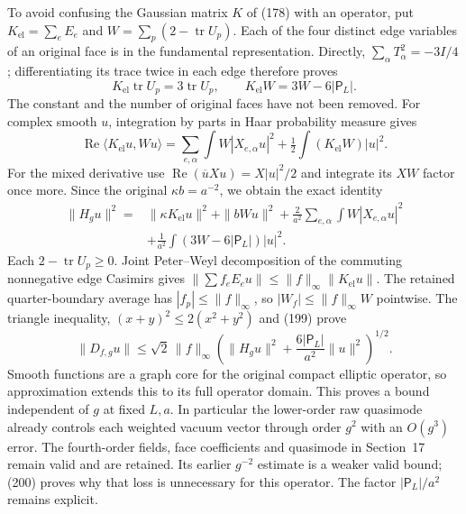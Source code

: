 \documentclass[11pt]{article}
\begin{document}
To avoid confusing the Gaussian matrix $K$ of (178)
with an operator, put $K_{\mathrm{el}}=\sum_eE_e$ and
$W=\sum_p(2-\operatorname{tr}U_p)$. Each of the four distinct edge
variables of an original face is in the fundamental representation.
Directly, $\sum_\alpha T_\alpha^2=-3I/4$; differentiating its
trace twice in each edge therefore proves
\[
 K_{\mathrm{el}}\operatorname{tr}U_p=3\operatorname{tr}U_p,
 \qquad K_{\mathrm{el}}W=3W-6|\mathsf P_L|.
\]
The constant and the number of original faces have not been removed.
For complex smooth $u$, integration by parts in Haar probability
measure gives
\[
 \operatorname{Re}\langle K_{\mathrm{el}}u,Wu\rangle
 =\sum_{e,\alpha}\int W|X_{e,\alpha}u|^2
       +\tfrac12\int(K_{\mathrm{el}}W)|u|^2.
\]
For the mixed derivative use
$\operatorname{Re}(\overline u Xu)=X|u|^2/2$ and integrate its
$XW$ factor once more. Since the original $\kappa b=a^{-2}$,
we obtain the exact identity
\begin{align}
 \|H_gu\|^2={}&\|\kappa K_{\mathrm{el}}u\|^2+\|bWu\|^2
   +\frac2{a^2}\sum_{e,\alpha}\int W|X_{e,\alpha}u|^2\nonumber\\
 &+\frac1{a^2}\int(3W-6|\mathsf P_L|)|u|^2.
 \label{eq:band-exact-graph}
\end{align}
Each $2-\operatorname{tr}U_p\ge0$. Joint Peter--Weyl decomposition
of the commuting nonnegative edge Casimirs gives
$\|\sum f_eE_eu\|\le\|f\|_\infty\|K_{\mathrm{el}}u\|$.
The retained quarter-boundary average has $|f_p|\le\|f\|_\infty$,
so $|W_f|\le\|f\|_\infty W$ pointwise. The triangle inequality,
$(x+y)^2\le2(x^2+y^2)$ and (199) prove
\begin{equation}\label{eq:band-weighted-graph}
 \|D_{f,g}u\|\le\sqrt2\,\|f\|_\infty
 \left(\|H_gu\|^2+\frac{6|\mathsf P_L|}{a^2}\|u\|^2\right)^{1/2}.
\end{equation}
Smooth functions are a graph core for the original compact elliptic
operator, so approximation extends this to its full operator domain.
This proves a bound independent of $g$ at fixed $L,a$. In particular
the lower-order raw quasimode already controls each weighted vacuum
vector through order $g^2$ with an $O(g^3)$ error. The fourth-order
fields, face coefficients and quasimode in Section~17 remain valid
and are retained. Its earlier $g^{-2}$ estimate is a weaker valid
bound; (200) proves why that loss is unnecessary
for this operator. The factor $|\mathsf P_L|/a^2$ remains explicit.
\end{document}
